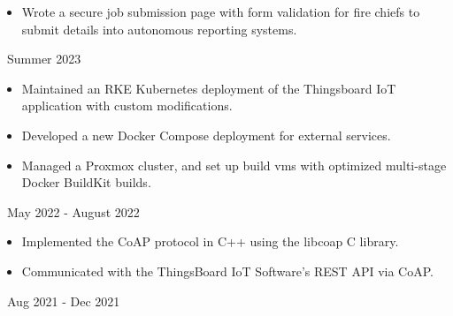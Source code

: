 \documentclass[11pt,letterpaper,ragged2e]{altacv}
\begin{document}

\hfuzz=5pt %

\begin{fullwidth}
	\makecvheader
\end{fullwidth}




{
	\begin{itemize}
		\item Wrote a secure job submission page with form validation for fire chiefs to submit details into autonomous reporting systems.
	\end{itemize}
}
{\faCalendar\, Summer 2023}
{
}


{
	\begin{itemize}
		\item Maintained an RKE Kubernetes deployment of the Thingsboard IoT application with custom modifications.
		\item Developed a new Docker Compose deployment for external services.
		\item Managed a Proxmox cluster, and set up build vms with optimized multi-stage Docker BuildKit builds.
	\end{itemize}
}
{\faCalendar\, May 2022 - August 2022}
{
}

{
	\begin{itemize}
		\item Implemented the CoAP protocol in C++ using the libcoap C library.
		\item Communicated with the ThingsBoard IoT Software's REST API via CoAP.
	\end{itemize}
}
{\faCalendar\, Aug 2021 - Dec 2021}
{
}
\end{document}
